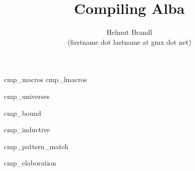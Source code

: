 \documentclass[12pt]{article}
\begin{document}


\title{
    Compiling Alba
}

\author{
    Helmut Brandl
    \\
    \scriptsize (firstname dot lastname at gmx dot net)
}
\date{}

\maketitle




\tableofcontents

 {cmp_macros}
 {cmp_lmacros}


 {cmp_universes}

 {cmp_bound}

 {cmp_inductive}

 {cmp_pattern_match}


 {cmp_elaboration}
\end{document}
